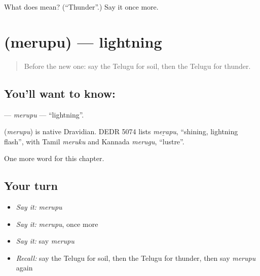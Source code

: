\begin{tcolorbox}[breakable,colback=teal!4,colframe=teal!35!black,title={Before you move on}]
What does  mean? (\textquotedblleft{}Thunder\textquotedblright{}.) Say it once more.
\end{tcolorbox}
\section[\texorpdfstring{\te{మెరుపు} (merupu)}{మెరుపు (merupu)}]{ (merupu) — lightning}

\label{lesson:TE-C121-merupu}



\begin{quote}
Before the new one: say the Telugu for soil, then the Telugu for thunder.
\end{quote}

\subsection*{You'll want to know: }
\textbf{} — \emph{merupu} — \textquotedblleft{}lightning\textquotedblright{}.

\begin{cousinweb}
\textbf{} (\emph{merupu}) is native Dravidian. DEDR 5074 lists \emph{meṟapu}, \textquotedblleft{}shining, lightning flash\textquotedblright{}, with Tamil \emph{meruku} and Kannada \emph{merugu}, \textquotedblleft{}lustre\textquotedblright{}.
\end{cousinweb}

\begin{grammarlens}[title={What you've built}]
One more word for this chapter.
\end{grammarlens}

\subsection*{Your turn}
\begin{itemize}
\raggedright
  \item \emph{Say it:} \emph{merupu}
  \item \emph{Say it:} \emph{merupu}, once more
  \item \emph{Say it:} say \emph{merupu}
  \item \emph{Recall:} say the Telugu for soil, then the Telugu for thunder, then say \emph{merupu} again
\end{itemize}


